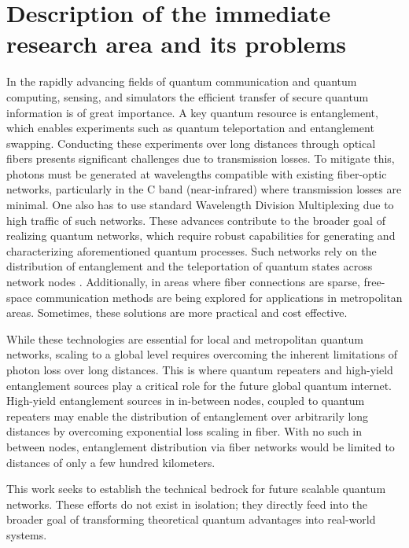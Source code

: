 \documentclass{article}
\theoremstyle{mytheoremstyle}
\theoremstyle{mytheoremstyle}
\theoremstyle{myproblemstyle}
\begin{document}

\section{Description of the immediate research area and its problems}

In the rapidly advancing fields of quantum communication and quantum computing, sensing, and simulators
the efficient transfer of secure quantum information is of great importance.
A key quantum resource is entanglement, which enables experiments such as quantum teleportation and entanglement swapping.
Conducting these experiments over long distances through optical fibers presents significant challenges due to transmission losses.
To mitigate this, photons must be generated at wavelengths compatible with existing fiber-optic networks,
particularly in the C band (near-infrared) where transmission losses are minimal.
One also has to use standard Wavelength Division Multiplexing due to high traffic of
such networks.
These advances contribute to the broader goal of realizing quantum networks,
which require robust capabilities for generating and characterizing aforementioned quantum processes.
Such networks rely on the distribution of entanglement and the teleportation of quantum states across network nodes \cite{Kimble_2008}.
Additionally, in areas where fiber connections are sparse,
free-space communication methods \cite{Kržić_et_al_2023} are being explored for applications in metropolitan areas. Sometimes,
these solutions are more practical and cost effective.
\par While these technologies are essential for local and metropolitan quantum networks, scaling to a global level requires overcoming
the inherent limitations of photon loss over long distances. This is where quantum repeaters and high-yield entanglement sources
play a critical role for the future global quantum internet. High-yield entanglement sources in in-between nodes, coupled to %
quantum repeaters may enable the distribution of entanglement over arbitrarily long distances by overcoming exponential loss scaling in fiber.
With no such in between nodes, entanglement distribution via fiber networks would be limited to distances of only a few hundred kilometers.
\par This work seeks to establish the technical bedrock for future scalable quantum networks. These efforts do not exist in isolation;
they directly feed into the broader goal of transforming theoretical quantum advantages into real-world systems.
\end{document}
